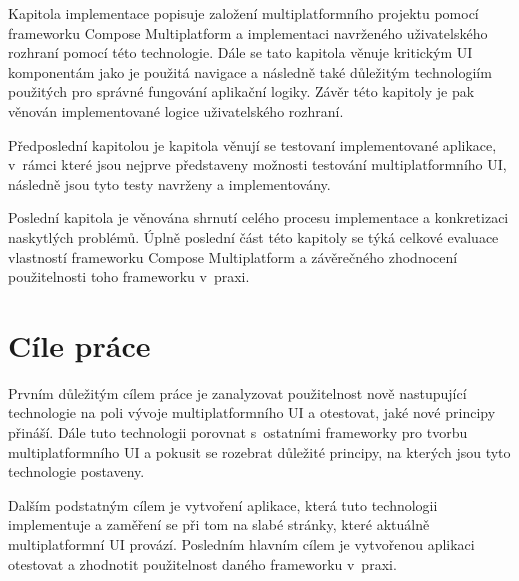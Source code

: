 \medskip

Kapitola implementace popisuje založení multiplatformního projektu pomocí frameworku Compose Multiplatform
a implementaci navrženého uživatelského rozhraní pomocí této technologie. Dále se tato kapitola věnuje kritickým UI komponentám
jako je použitá navigace a následně také důležitým technologiím použitých pro správné fungování aplikační logiky. Závěr této kapitoly
je pak věnován implementované logice uživatelského rozhraní.

\medskip

Předposlední kapitolou je kapitola věnují se testovaní implementované aplikace, v~rámci které jsou nejprve představeny možnosti testování
multiplatformního UI, následně jsou tyto testy navrženy a implementovány.


\medskip


Poslední kapitola je věnována shrnutí celého procesu implementace a konkretizaci naskytlých problémů. Úplně poslední část této kapitoly se týká celkové evaluace
vlastností frameworku Compose Multiplatform a závěrečného zhodnocení použitelnosti toho frameworku v~praxi.

\newpage

\section{Cíle práce} \label{goals}
Prvním důležitým cílem práce je zanalyzovat použitelnost nově nastupující technologie na poli vývoje multiplatformního UI a otestovat, jaké
nové principy přináší. Dále tuto technologii porovnat s~ostatními frameworky pro tvorbu multiplatformního UI a pokusit se
rozebrat důležité principy, na kterých jsou tyto technologie postaveny. 

Dalším podstatným cílem je vytvoření aplikace, která tuto technologii implementuje a zaměření se při tom na slabé stránky, 
které aktuálně multiplatformní UI provází. 
Posledním hlavním cílem je vytvořenou aplikaci otestovat a zhodnotit použitelnost daného frameworku v~praxi.

